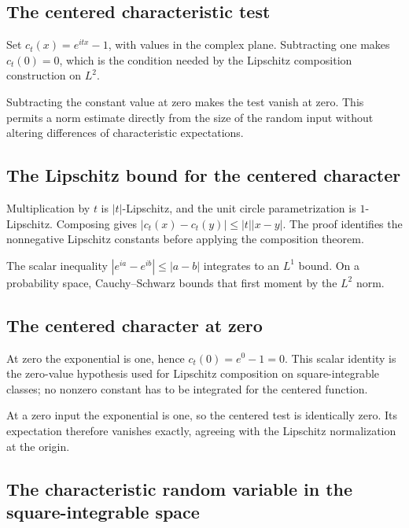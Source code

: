 \documentclass[11pt,a4paper]{article}
\begin{document}
\subsection{\texorpdfstring{The centered characteristic test}{The centered characteristic test}}


Set \(c_t(x)=e^{itx}-1\), with values in the complex plane. Subtracting one makes \(c_t(0)=0\), which is the condition needed by the Lipschitz composition construction on \(L^2\).



Subtracting the constant value at zero makes the test vanish at zero. This permits a norm estimate directly from the size of the random input without altering differences of characteristic expectations.


\subsection{\texorpdfstring{The Lipschitz bound for the centered character}{The Lipschitz bound for the centered character}}


Multiplication by \(t\) is \(|t|\)-Lipschitz, and the unit circle parametrization is \(1\)-Lipschitz. Composing gives \(|c_t(x)-c_t(y)|\le|t||x-y|\). The proof identifies the nonnegative Lipschitz constants before applying the composition theorem.



The scalar inequality \(|e^{ia}-e^{ib}|\le|a-b|\) integrates to an \(L^1\) bound. On a probability space, Cauchy–Schwarz bounds that first moment by the \(L^2\) norm.


\subsection{\texorpdfstring{The centered character at zero}{The centered character at zero}}


At zero the exponential is one, hence \(c_t(0)=e^0-1=0\). This scalar identity is the zero-value hypothesis used for Lipschitz composition on square-integrable classes; no nonzero constant has to be integrated for the centered function.



At a zero input the exponential is one, so the centered test is identically zero. Its expectation therefore vanishes exactly, agreeing with the Lipschitz normalization at the origin.


\subsection{\texorpdfstring{The characteristic random variable in the square-integrable space}{The characteristic random variable in the square-integrable space}}
\end{document}
